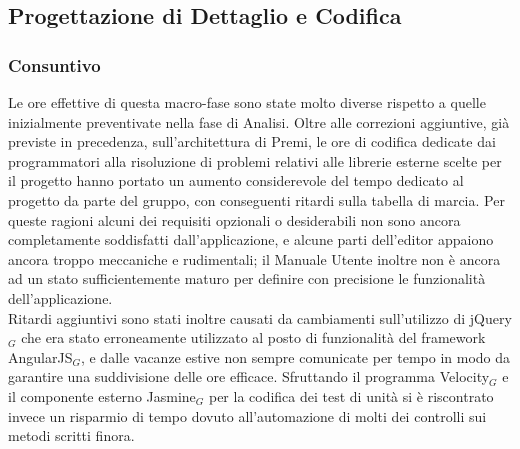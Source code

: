 \subsection{Progettazione di Dettaglio e Codifica}

\subsubsection{Consuntivo}
Le ore effettive di questa macro-fase sono state molto diverse rispetto a quelle inizialmente preventivate nella fase di Analisi. Oltre alle correzioni aggiuntive, già previste in precedenza, sull'architettura di Premi, le ore di codifica dedicate dai programmatori alla risoluzione di problemi relativi alle librerie esterne scelte per il progetto hanno portato un aumento considerevole del tempo dedicato al progetto da parte del gruppo, con conseguenti ritardi sulla tabella di marcia. Per queste ragioni alcuni dei requisiti opzionali o desiderabili non sono ancora completamente soddisfatti dall'applicazione, e alcune parti dell'editor appaiono ancora troppo meccaniche e rudimentali; il Manuale Utente inoltre non è ancora ad un stato sufficientemente maturo per definire con precisione le funzionalità dell'applicazione. \\ 
Ritardi aggiuntivi sono stati inoltre causati da cambiamenti sull'utilizzo di jQuery$_G$ che era stato erroneamente utilizzato al posto di funzionalità del framework AngularJS$_G$, e dalle vacanze estive non sempre comunicate per tempo in modo da garantire una suddivisione delle ore efficace.
Sfruttando il programma Velocity$_G$ e il componente esterno Jasmine$_G$ per la codifica dei test di unità si è riscontrato invece un risparmio di tempo dovuto all'automazione di molti dei controlli sui metodi scritti finora. 



